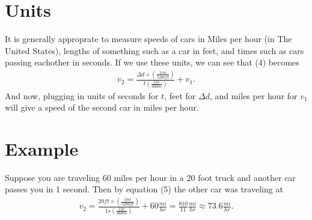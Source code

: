 \documentclass[]{article}
\begin{document}
\section{Units}
It is generally approprate to measure speeds of cars in Miles per hour (in The United States), lengths of something such as a car in feet, and times such as cars passing eachother in seconds. If we use these units, we can see that (4) becomes
\begin{align}
v_2=\frac{\Delta d \times \left(\frac{1 mi}{5280 ft}\right)}{t\left(\frac{1 hr}{3600 s}\right)}+v_1.
\end{align}
And now, plugging in units of seconds for $t$, feet for $\Delta d$, and miles per hour for $v_1$ will give a speed of the second car in miles per hour.

\section{Example}
Suppose you are traveling 60 miles per hour in a 20 foot truck and another car passes you in 1 second. Then by equation (5) the other car was traveling at
\begin{align}
v_2=\frac{20 ft \times \left(\frac{1 mi}{5280 ft}\right)}{1 s\left(\frac{1 hr}{3600 s}\right)}+60 \frac{mi}{hr} = \frac{810}{11} \frac{mi}{hr} \approx 73.6 \frac{mi}{hr}.
\end{align}

\end{document}
